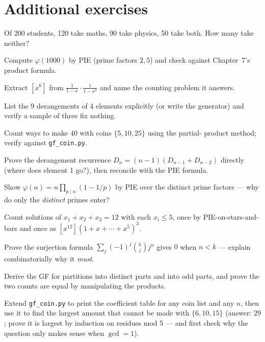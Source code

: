 \section{Additional exercises}
\begin{exercise}[easy]
Of 200 students, 120 take maths, 90 take physics, 50 take both. How
many take neither?
\end{exercise}
\begin{exercise}[easy]
Compute $\varphi(1000)$ by PIE (prime factors $2, 5$) and check against
Chapter~7's product formula.
\end{exercise}
\begin{exercise}[easy]
Extract $[x^6]$ from $\frac{1}{1-x} \cdot \frac{1}{1-x^3}$ and name
the counting problem it answers.
\end{exercise}
\begin{exercise}[easy]
List the 9 derangements of 4 elements explicitly (or write the
generator) and verify a sample of three fix nothing.
\end{exercise}
\begin{exercise}[medium]
Count ways to make $40$ with coins $\{5,10,25\}$ using the partial-
product method; verify against \texttt{gf\_coin.py}.
\end{exercise}
\begin{exercise}[medium]
Prove the derangement recurrence $D_n = (n-1)(D_{n-1} + D_{n-2})$
directly (where does element 1 go?), then reconcile with the PIE
formula.
\end{exercise}
\begin{exercise}[medium]
Show $\varphi(n) = n\prod_{p\mid n}(1-1/p)$ by PIE over the distinct
prime factors --- why do only the \emph{distinct} primes enter?
\end{exercise}
\begin{exercise}[medium]
Count solutions of $x_1+x_2+x_3 = 12$ with each $x_i \le 5$, once by
PIE-on-stars-and-bars and once as $[x^{12}](1+x+\cdots+x^5)^3$.
\end{exercise}
\begin{exercise}[hard]
Prove the surjection formula $\sum_j(-1)^j\binom{k}{j}j^n$ gives $0$
when $n < k$ --- explain combinatorially why it \emph{must}.
\end{exercise}
\begin{exercise}[hard]
Derive the GF for partitions into distinct parts and into odd parts,
and prove the two counts are equal by manipulating the products.
\end{exercise}
\begin{exercise}[hard]
Extend \texttt{gf\_coin.py} to print the coefficient table for any coin
list and any $n$, then use it to find the largest amount that cannot be
made with $\{6, 10, 15\}$ (answer: $29$; prove it is largest by
induction on residues mod 5 --- and first check why the question only
makes sense when $\gcd = 1$).
\end{exercise}
